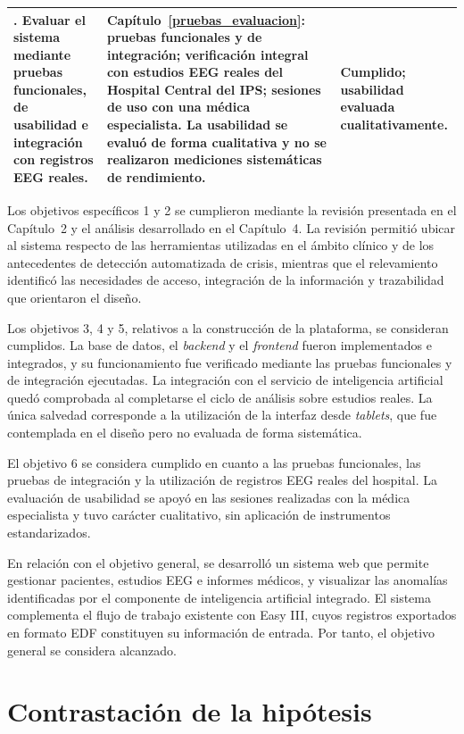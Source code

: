 \begin{longtable}{|
>{\raggedright\arraybackslash}p{}|
>{\raggedright\arraybackslash}p{}|
>{\raggedright\arraybackslash}p{}|}
6. Evaluar el sistema mediante pruebas funcionales, de usabilidad e integración con registros EEG reales. &
Capítulo~\ref{pruebas_evaluacion}: pruebas funcionales y de integración; verificación integral con estudios EEG reales del Hospital Central del IPS; sesiones de uso con una médica especialista.
La usabilidad se evaluó de forma cualitativa y no se realizaron mediciones sistemáticas de rendimiento. &
Cumplido; usabilidad evaluada cualitativamente. \\
\hline

\end{longtable}
\endgroup

Los objetivos específicos 1 y 2 se cumplieron mediante la revisión presentada en el Capítulo~2 y el análisis desarrollado en el Capítulo~4.
La revisión permitió ubicar al sistema respecto de las herramientas utilizadas en el ámbito clínico y de los antecedentes de detección automatizada de crisis, mientras que el relevamiento identificó las necesidades de acceso, integración de la información y trazabilidad que orientaron el diseño.

Los objetivos 3, 4 y 5, relativos a la construcción de la plataforma, se consideran cumplidos.
La base de datos, el \textit{backend} y el \textit{frontend} fueron implementados e integrados, y su funcionamiento fue verificado mediante las pruebas funcionales y de integración ejecutadas.
La integración con el servicio de inteligencia artificial quedó comprobada al completarse el ciclo de análisis sobre estudios reales.
La única salvedad corresponde a la utilización de la interfaz desde \textit{tablets}, que fue contemplada en el diseño pero no evaluada de forma sistemática.

El objetivo 6 se considera cumplido en cuanto a las pruebas funcionales, las pruebas de integración y la utilización de registros EEG reales del hospital.
La evaluación de usabilidad se apoyó en las sesiones realizadas con la médica especialista y tuvo carácter cualitativo, sin aplicación de instrumentos estandarizados.

En relación con el objetivo general, se desarrolló un sistema web que permite gestionar pacientes, estudios EEG e informes médicos, y visualizar las anomalías identificadas por el componente de inteligencia artificial integrado.
El sistema complementa el flujo de trabajo existente con Easy III, cuyos registros exportados en formato EDF constituyen su información de entrada.
Por tanto, el objetivo general se considera alcanzado.


\section{Contrastación de la hipótesis}
\label{sec:contrastacion-hipotesis}

